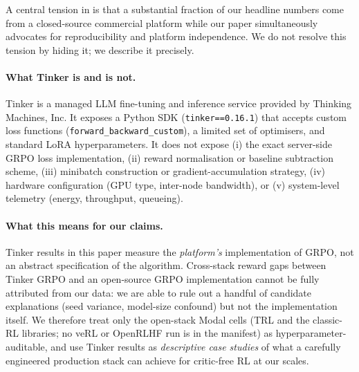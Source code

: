 A central tension in \ours{} is that a substantial fraction of our
headline numbers come from a closed-source commercial platform while our
paper simultaneously advocates for reproducibility and platform
independence. We do not resolve this tension by hiding it; we describe
it precisely.

\paragraph{What Tinker is and is not.}
Tinker \cite{thinkingmachines2024tinker} is a managed LLM fine-tuning and
inference service provided by Thinking Machines, Inc. It exposes a Python
SDK (\texttt{tinker==0.16.1}) that accepts custom loss functions
(\texttt{forward\_backward\_custom}), a limited set of optimisers, and
standard LoRA hyperparameters. It does not expose (i) the exact server-side
GRPO loss implementation, (ii) reward normalisation or baseline subtraction
scheme, (iii) minibatch construction or gradient-accumulation strategy,
(iv) hardware configuration (GPU type, inter-node bandwidth), or (v)
system-level telemetry (energy, throughput, queueing).

\paragraph{What this means for our claims.}
Tinker results in this paper measure the \emph{platform's} implementation
of GRPO, not an abstract specification of the algorithm. Cross-stack reward
gaps between Tinker GRPO and an open-source GRPO implementation cannot be
fully attributed from our data: we are able to rule out a handful of
candidate explanations (seed variance, model-size confound) but not the
implementation itself. We therefore treat only the open-stack Modal cells (TRL and the
classic-RL libraries; no veRL or OpenRLHF run is in the manifest) as
hyperparameter-auditable, and use Tinker results as
\emph{descriptive case studies} of what a carefully engineered production
stack can achieve for critic-free RL at our scales.

